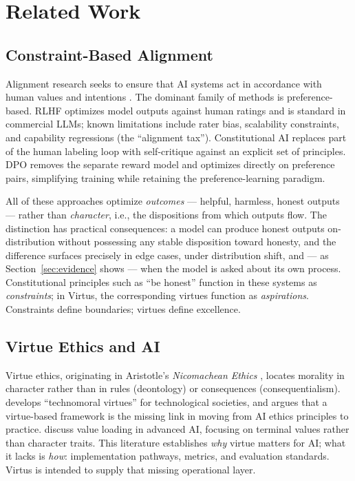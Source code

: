 \documentclass[11pt]{article}
\begin{document}
\section{Related Work}
\label{sec:related}

\subsection{Constraint-Based Alignment}

Alignment research seeks to ensure that AI systems act in accordance with human values and intentions \citep{bostrom2014superintelligence,russell2019human}. The dominant family of methods is preference-based. RLHF \citep{christiano2017deep} optimizes model outputs against human ratings and is standard in commercial LLMs; known limitations include rater bias, scalability constraints, and capability regressions (the ``alignment tax''). Constitutional AI \citep{bai2022constitutional} replaces part of the human labeling loop with self-critique against an explicit set of principles. DPO \citep{rafailov2023direct} removes the separate reward model and optimizes directly on preference pairs, simplifying training while retaining the preference-learning paradigm.

All of these approaches optimize \emph{outcomes} --- helpful, harmless, honest outputs --- rather than \emph{character}, i.e., the dispositions from which outputs flow. The distinction has practical consequences: a model can produce honest outputs on-distribution without possessing any stable disposition toward honesty, and the difference surfaces precisely in edge cases, under distribution shift, and --- as Section~\ref{sec:evidence} shows --- when the model is asked about its own process. Constitutional principles such as ``be honest'' function in these systems as \emph{constraints}; in Virtus, the corresponding virtues function as \emph{aspirations}. Constraints define boundaries; virtues define excellence.

\subsection{Virtue Ethics and AI}

Virtue ethics, originating in Aristotle's \emph{Nicomachean Ethics} \citep{aristotle_ne}, locates morality in character rather than in rules (deontology) or consequences (consequentialism). \citet{vallor2016technology} develops ``technomoral virtues'' for technological societies, and \citet{hagendorff2022virtue} argues that a virtue-based framework is the missing link in moving from AI ethics principles to practice. \citet{bostrom2014ethics} discuss value loading in advanced AI, focusing on terminal values rather than character traits. This literature establishes \emph{why} virtue matters for AI; what it lacks is \emph{how}: implementation pathways, metrics, and evaluation standards. Virtus is intended to supply that missing operational layer.
\end{document}
